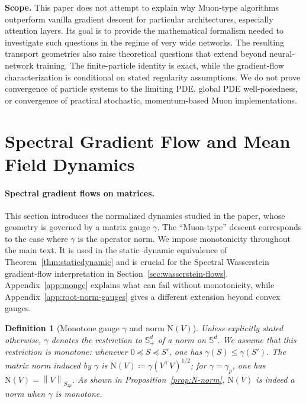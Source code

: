 \documentclass{article}
\newtheorem{definition}[theorem]{Definition}
\newcommand{\mN}{\mathrm{N}}
\newcommand{\norm}[1]{\left\lVert #1 \right\rVert}
\begin{document}
\textbf{Scope.} This paper does not attempt to explain why Muon-type
algorithms outperform vanilla gradient descent for particular architectures,
especially attention layers. Its goal is to provide the mathematical
formalism needed to investigate such questions in the regime of very wide
networks. The resulting transport geometries also raise theoretical questions
that extend beyond neural-network training. The finite-particle identity is
exact, while the gradient-flow characterization is conditional on stated
regularity assumptions. We do not prove convergence of particle systems to
the limiting PDE, global PDE well-posedness, or convergence of practical
stochastic, momentum-based Muon implementations.


\section{Spectral Gradient Flow and Mean Field Dynamics}
\label{sec:flows}

\paragraph{Spectral gradient flows on matrices.}

This section introduces the normalized dynamics studied in the paper, whose
geometry is governed by a matrix gauge $\gamma$. The ``Muon-type'' descent
corresponds to the case where $\gamma$ is the operator norm.
%
We impose monotonicity throughout the main text. It is used in the
static--dynamic equivalence of Theorem~\ref{thm:staticdynamic} and is crucial
for the Spectral Wasserstein gradient-flow interpretation in
Section~\ref{sec:wasserstein-flows}. Appendix~\ref{app:monge} explains what can
fail without monotonicity, while Appendix~\ref{app:root-norm-gauges} gives a
different extension beyond convex gauges.


\begin{definition}[Monotone gauge $\gamma$ and norm $\mN(V)$]
\label{def:monotone-norm}
Unless explicitly stated otherwise, $\gamma$ denotes the restriction to $\mathbb S_+^d$ of a
norm on $\mathbb S^d$. We assume that this restriction is monotone: whenever
$0\preceq S\preceq S'$, one has $\gamma(S)\le\gamma(S')$. 
%
The matrix norm induced by $\gamma$ is $\mN(V)\coloneqq \gamma(V^\top V)^{1/2}$; for $\gamma=\gamma_p$, one has $\mN(V)=\norm{V}_{S_{2p}}$. 
As shown in Proposition~\ref{prop:N-norm}, $\mN(V)$ is indeed a norm when $\gamma$ is monotone.
\end{definition}
\end{document}
